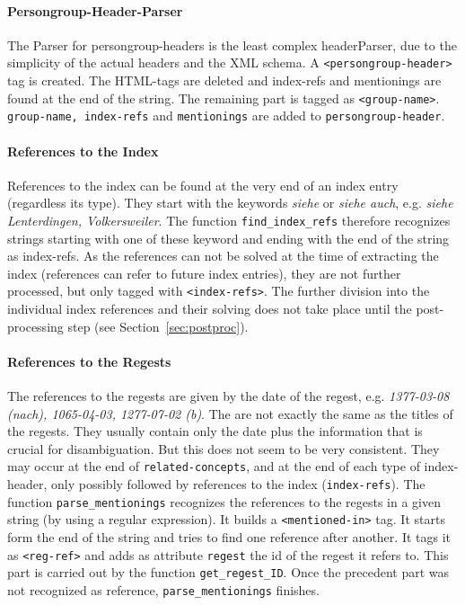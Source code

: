 \paragraph{Persongroup-Header-Parser}
The Parser for persongroup-headers is the least complex headerParser,
due to the simplicity of the actual headers and the XML schema. A
\texttt{<persongroup-header>} tag is created. The HTML-tags are
deleted and index-refs and mentionings are found at the end of the
string. The remaining part is tagged as \texttt{<group-name>}.
\texttt{group-name, index-refs} and \texttt{mentionings} are added to
\texttt{persongroup-header}.

\paragraph{References to the Index}
\label{sec:index-refs}
References to the index can be found at the very end of an index entry
(regardless its type). They start with the keywords \textit{siehe} or
\textit{siehe auch}, e.g. \textit{siehe Lenterdingen, Volkersweiler}.
The function \texttt{find\_index\_refs} therefore recognizes strings
starting with one of these keyword and ending with the end of the
string as index-refs. As the references can not be solved at the time
of extracting the index (references can refer to future index
entries), they are not further processed, but only tagged with
\texttt{<index-refs>}. The further division into the individual index
references and their solving does not take place until the
post-processing step (see Section~\ref{sec:postproc}).

\paragraph{References to the Regests}
\label{sec:reg-refs}
The references to the regests are given by the date of the regest,
e.g. \textit{1377-03-08 (nach), 1065-04-03, 1277-07-02 (b)}. The are
not exactly the same as the titles of the regests. They usually
contain only the date plus the information that is crucial for
disambiguation. But this does not seem to be very consistent. They may
occur at the end of \texttt{related-concepts}, and at the end of each
type of index-header, only possibly followed by references to the
index (\texttt{index-refs}). The function \texttt{parse\_mentionings}
recognizes the references to the regests in a given string (by using a
regular expression). It builds a \texttt{<mentioned-in>} tag. It
starts form the end of the string and tries to find one reference
after another. It tags it as \texttt{<reg-ref>} and adds as attribute
\texttt{regest} the id of the regest it refers to. This part is
carried out by the function \texttt{get\_regest\_ID}. Once the
precedent part was not recognized as reference,
\texttt{parse\_mentionings} finishes.

